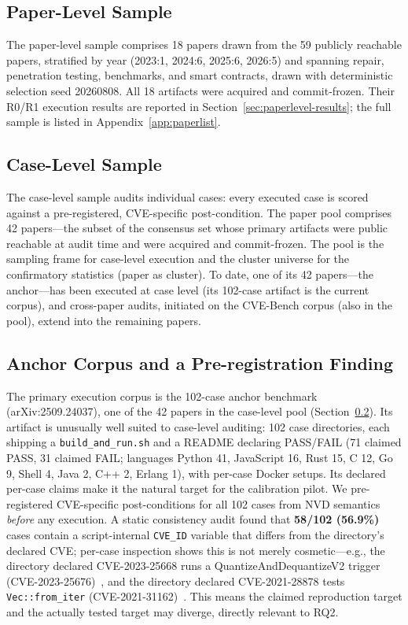 \documentclass[11pt]{article}
\begin{document}
\subsection{Paper-Level Sample}
\label{sec:paperlevel}

The paper-level sample comprises 18 papers drawn from the 59 publicly reachable papers, stratified by year (2023:1, 2024:6, 2025:6, 2026:5) and spanning repair, penetration testing, benchmarks, and smart contracts, drawn with deterministic selection seed 20260808. All 18 artifacts were acquired and commit-frozen. Their R0/R1 execution results are reported in Section~\ref{sec:paperlevel-results}; the full sample is listed in Appendix~\ref{app:paperlist}.

\subsection{Case-Level Sample}
\label{sec:caselevel}

The case-level sample audits individual cases: every executed case is scored against a pre-registered, CVE-specific post-condition. The paper pool comprises 42 papers---the subset of the consensus set whose primary artifacts were public reachable at audit time and were acquired and commit-frozen. The pool is the sampling frame for case-level execution and the cluster universe for the confirmatory statistics (paper as cluster). To date, one of its 42 papers---the anchor---has been executed at case level (its 102-case artifact is the current corpus), and cross-paper audits, initiated on the CVE-Bench corpus (also in the pool), extend into the remaining papers.

\subsection{Anchor Corpus and a Pre-registration Finding}
\label{sec:anchor}
The primary execution corpus is the 102-case anchor benchmark~\citep{anchor2509} (arXiv:2509.24037), one of the 42 papers in the case-level pool (Section~\ref{sec:caselevel}). Its artifact is unusually well suited to case-level auditing: 102 case directories, each shipping a \texttt{build\_and\_run.sh} and a README declaring PASS/FAIL (71 claimed PASS, 31 claimed FAIL; languages Python 41, JavaScript 16, Rust 15, C 12, Go 9, Shell 4, Java 2, C++ 2, Erlang 1), with per-case Docker setups. Its declared per-case claims make it the natural target for the calibration pilot. We pre-registered CVE-specific post-conditions for all 102 cases from NVD semantics \emph{before} any execution. A static consistency audit found that \textbf{58/102 (56.9\%)} cases contain a script-internal \texttt{CVE\_ID} variable that differs from the directory's declared CVE; per-case inspection shows this is not merely cosmetic---e.g., the directory declared CVE-2023-25668 runs a QuantizeAndDequantizeV2 trigger (CVE-2023-25676)~\citep{nvd202325676}, and the directory declared CVE-2021-28878 tests \texttt{Vec::from\_iter} (CVE-2021-31162)~\citep{nvd202131162}. This means the claimed reproduction target and the actually tested target may diverge, directly relevant to RQ2. 
\end{document}
